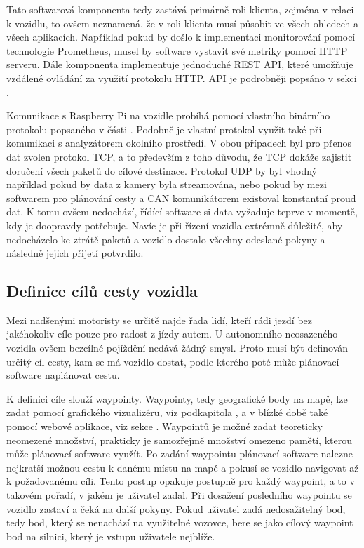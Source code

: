 \documentclass[czech,bachelor,dept460,male,cpp,cpdeclaration]{diploma}
\begin{document}
Tato softwarová komponenta tedy zastává primárně roli klienta, zejména v relaci k vozidlu, to ovšem neznamená, že v roli klienta 
musí působit ve všech ohledech a všech aplikacích. Například pokud by došlo k implementaci monitorování pomocí technologie 
Prometheus, musel by software vystavit své metriky pomocí HTTP serveru. Dále komponenta implementuje jednoduché REST API, které 
umožňuje vzdálené ovládání za využití protokolu HTTP. API je podrobněji popsáno v sekci .

Komunikace s Raspberry Pi na vozidle probíhá pomocí vlastního binárního protokolu popsaného v části . 
Podobně je vlastní protokol využit také při komunikaci s analyzátorem okolního prostředí. V obou případech byl pro přenos dat 
zvolen protokol TCP, a to především z toho důvodu, že TCP dokáže zajistit doručení všech paketů do cílové destinace. Protokol UDP
by byl vhodný například pokud by data z kamery byla streamována, nebo pokud by mezi softwarem pro plánování cesty a CAN 
komunikátorem existoval konstantní proud dat. K tomu ovšem nedochází, řídící software si data vyžaduje teprve v momentě, kdy je
doopravdy potřebuje. Navíc je při řízení vozidla extrémně důležité, aby nedocházelo ke ztrátě paketů a vozidlo dostalo všechny 
odeslané pokyny a následně jejich přijetí potvrdilo.

\subsection{Definice cílů cesty vozidla}

Mezi nadšenými motoristy se určitě najde řada lidí, kteří rádi jezdí bez jakéhokoliv cíle pouze pro radost z jízdy autem. 
U autonomního neosazeného vozidla ovšem bezcílné pojíždění nedává žádný smysl. Proto musí být definován určitý cíl cesty, kam
se má vozidlo dostat, podle kterého poté může plánovací software naplánovat cestu. 

K definici cíle slouží waypointy. Waypointy, tedy geografické body na mapě, lze zadat pomocí grafického vizualizéru, 
viz podkapitola , a v blízké době také pomocí webové aplikace, viz sekce . Waypointů je možné 
zadat teoreticky neomezené množství, prakticky je samozřejmě množství omezeno pamětí, kterou může plánovací software využít. 
Po zadání waypointu plánovací software nalezne nejkratší možnou cestu k danému místu na mapě a pokusí se vozidlo navigovat až 
k požadovanému cíli. Tento postup opakuje postupně pro každý waypoint, a to v takovém pořadí, v jakém je uživatel zadal. 
Při dosažení posledního waypointu se vozidlo zastaví a čeká na další pokyny. Pokud uživatel zadá nedosažitelný bod, tedy bod, 
který se nenachází na využitelné vozovce, bere se jako cílový waypoint bod na silnici, který je vstupu uživatele nejblíže.
\end{document}
